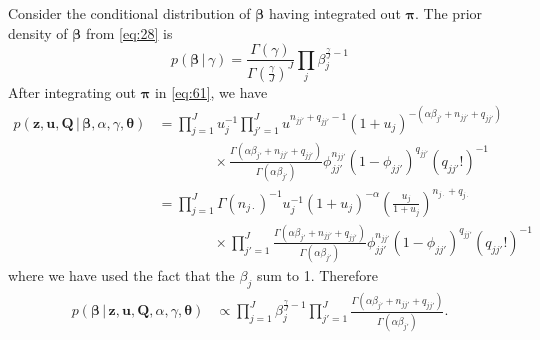 \documentclass[12pt,letterpaper]{report}
\newcommand{\given}{\, \vert \,}
\newcommand{\bQ}{\mathbf{Q}}
\newcommand{\bz}{\mathbf{z}}
\newcommand{\bu}{\mathbf{u}}
\newcommand{\bbeta}{\boldsymbol{\beta}}
\newcommand{\btheta}{\boldsymbol{\theta}}
\newcommand{\bpi}{\boldsymbol{\pi}}
\begin{document}
Consider the conditional distribution of $\bbeta$ having
integrated out $\bpi$.  The prior density of $\bbeta$ from
\eqref{eq:28} is
\begin{equation}
  \label{eq:62}
  p(\bbeta \given \gamma) =
  \frac{\Gamma(\gamma)}{\Gamma(\frac{\gamma}{J})^J} \prod_{j}
  \beta_j^{\frac{\gamma}{J} - 1}
\end{equation}
After integrating out $\bpi$ in \eqref{eq:61}, we have
\begin{align}
  p(\bz, \bu, \bQ \given \bbeta, \alpha, \gamma, \btheta) &=
  \prod_{j=1}^J u_{j} ^{-1}
  \prod_{j'=1}^J u^{n_{jj'} + q_{jj'} - 1}(1 +
  u_j)^{-(\alpha\beta_{j'} + n_{jj'} + q_{jj'})}
  \\
  &\qquad \qquad \times \frac{\Gamma(\alpha\beta_{j'} + n_{jj'} +
    q_{jj'})}{\Gamma(\alpha\beta_{j'})} \phi_{jj'}^{n_{jj'}}(1-\phi_{jj'})^{q_{jj'}}
  (q_{jj'}!)^{-1} \\
  &= \prod_{j=1}^J \Gamma(n_{j\cdot})^{-1} u_j^{-1}(1+u_j)^{-\alpha}
  \left(\frac{u_j}{1+u_j}\right)^{n_{j\cdot} + q_{j\cdot}} \\ &\qquad
  \qquad \times \prod_{j' =
    1}^J \frac{\Gamma(\alpha\beta_{j'} + n_{jj'} +
    q_{jj'})}{\Gamma(\alpha\beta_{j'})} \phi_{jj'}^{n_{jj'}}(1-\phi_{jj'})^{q_{jj'}}
  (q_{jj'}!)^{-1}
\end{align}
 where we have used the fact that the $\beta_j$ sum to 1.  Therefore
\begin{align}
  p(\bbeta \given \bz, \bu, \bQ, \alpha, \gamma, \btheta) &\propto \prod_{j=1}^J
  \beta_j^{\frac{\gamma}{J} - 1} \prod_{j'=1}^J \frac{\Gamma(\alpha\beta_{j'} +
    n_{jj'} + q_{jj'})}{\Gamma(\alpha\beta_{j'})}.
\end{align}
\end{document}
